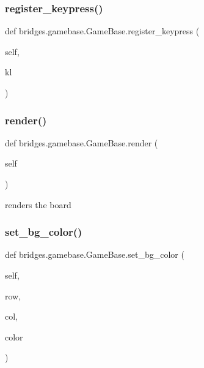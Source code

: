 \subsubsection{\texorpdfstring{register\_keypress()}{register\_keypress()}}
{\footnotesize\ttfamily def bridges.\+gamebase.\+Game\+Base.\+register\+\_\+keypress (\begin{DoxyParamCaption}\item[{}]{self,  }\item[{}]{kl }\end{DoxyParamCaption})}

\mbox{\label{classbridges_1_1gamebase_1_1_game_base_a3ae3bcb9702097029509d4123bc9276e}} 
\subsubsection{\texorpdfstring{render()}{render()}}
{\footnotesize\ttfamily def bridges.\+gamebase.\+Game\+Base.\+render (\begin{DoxyParamCaption}\item[{}]{self }\end{DoxyParamCaption})}



renders the board 

\mbox{\label{classbridges_1_1gamebase_1_1_game_base_a669740699d8d3a848172febbfbfa174f}} 
\subsubsection{\texorpdfstring{set\_bg\_color()}{set\_bg\_color()}}
{\footnotesize\ttfamily def bridges.\+gamebase.\+Game\+Base.\+set\+\_\+bg\+\_\+color (\begin{DoxyParamCaption}\item[{}]{self,  }\item[{}]{row,  }\item[{}]{col,  }\item[{}]{color }\end{DoxyParamCaption})}



